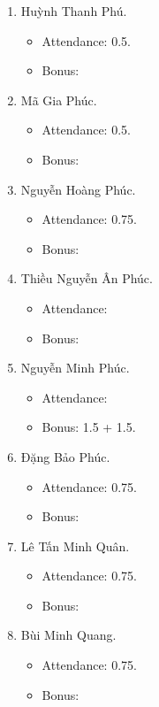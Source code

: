\documentclass{article}
\begin{document}
\begin{enumerate}
\begin{itemize}
    \end{itemize}
    \item {\sc Huỳnh Thanh Phú.}
    \begin{itemize}
        \item Attendance: 0.5.
        \item Bonus:
    \end{itemize}
    \item {\sc Mã Gia Phúc.}
    \begin{itemize}
        \item Attendance: 0.5.
        \item Bonus:
    \end{itemize}
    \item {\sc Nguyễn Hoàng Phúc.}
    \begin{itemize}
        \item Attendance: 0.75.
        \item Bonus:
    \end{itemize}
    \item {\sc Thiều Nguyễn Ân Phúc.}
    \begin{itemize}
        \item Attendance:
        \item Bonus:
    \end{itemize}
    \item {\sc Nguyễn Minh Phúc.}
    \begin{itemize}
        \item Attendance:
        \item Bonus: 1.5 + 1.5.
    \end{itemize}
    \item {\sc Đặng Bảo Phúc.}
    \begin{itemize}
        \item Attendance: 0.75.
        \item Bonus:
    \end{itemize}
    \item {\sc Lê Tấn Minh Quân.}
    \begin{itemize}
        \item Attendance: 0.75.
        \item Bonus:
    \end{itemize}
    \item {\sc Bùi Minh Quang.}
    \begin{itemize}
        \item Attendance: 0.75.
        \item Bonus:
    \end{itemize}

\end{enumerate}
\end{document}
